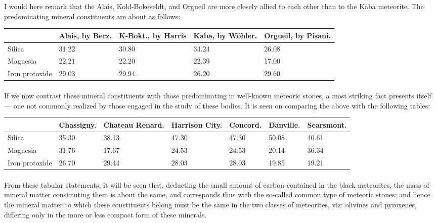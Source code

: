 \documentclass[a4paper, 11pt, oneside, english]{article}
\begin{document}
I would here remark that the Alais, Kold-Bokeveldt, and Orgueil are more closely allied to each other than to the Kaba meteorite. The predominating mineral constituents are about as follows:
\begin{table}[H]
    \centering\small
    \begin{tabular}{|l|p{15mm}|p{15mm}|p{15mm}|p{15mm}|}
    \hline
        ~ & Alais, by Berz. & K-Bokt., by Harris & Kaba, by Wöhler. & Orgueil, by Pisani. \\ \hline
        Silica & 31.22 & 30.80 & 34.24 & 26.08 \\ \hline
        Magnesia & 22.21 & 22.20 & 22.39 & 17.00 \\ \hline
        Iron protoxide & 29.03 & 29.94 & 26.20 & 29.60 \\ \hline
    \end{tabular}
\end{table}
\paragraph{}
If we now contrast these mineral constituents with those predominating in well-known meteoric stones, a most striking fact presents itself --- one not commonly realized by those engaged in the study of these bodies. It is seen on comparing the above with the following tables:
\begin{table}[H]
    \centering\small
    \begin{tabular}{|p{14mm}|p{15mm}|p{15mm}|p{12mm}|p{12mm}|p{12mm}|p{16mm}|}
    \hline
        ~ & Chassigny. & Chateau Renard. & Harrison City. & Concord. & Danville. & Searsmont. \\ \hline
        Silica & 35.30 & 38.13 & 47.30 & 47.30 & 50.08 & 40.61 \\ \hline
        Magnesia & 31.76 & 17.67 & 24.53 & 24.53 & 20.14 & 36.34 \\ \hline
        Iron protoxide & 26.70 & 29.44 & 28.03 & 28.03 & 19.85 & 19.21 \\ \hline
    \end{tabular}
\end{table}
\paragraph{}
From these tabular statements, it will be seen that, deducting the small amount of carbon contained in the black meteorites, the mass of mineral matter constituting them is about the same, and corresponds thus with the so-called common type of meteoric stones; and hence the mineral matter to which these constituents belong must be the same in the two classes of meteorites, viz: olivines and pyroxenes, differing only in the more or less compact form of these minerals.
\end{document}
